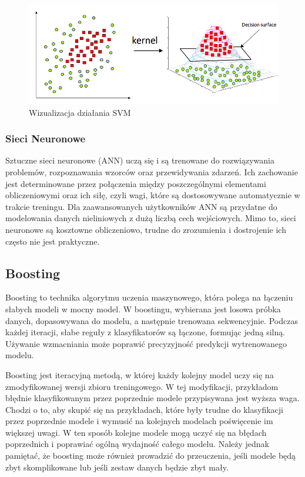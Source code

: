 \documentclass[12pt,a4paper]{article}
\begin{document}
\begin{figure}[h]
    \centering
    \includegraphics[width=0.75\linewidth]{images/svm-visualization.png}
    \caption{Wizualizacja działania SVM \cite{svm-visualization}}
\end{figure}

\subsubsection{Sieci Neuronowe}
Sztuczne sieci neuronowe (ANN) uczą się i są trenowane do rozwiązywania problemów, rozpoznawania wzorców oraz przewidywania zdarzeń. Ich zachowanie jest determinowane przez połączenia między poszczególnymi elementami obliczeniowymi oraz ich siłę, czyli wagi, które są dostosowywane automatycznie w trakcie treningu. Dla zaawansowanych użytkowników ANN są przydatne do modelowania danych nieliniowych z dużą liczbą cech wejściowych. Mimo to, sieci neuronowe są kosztowne obliczeniowo, trudne do zrozumienia i dostrojenie ich często nie jest praktyczne. \cite{classification-models}

\subsection{Boosting}
\label{sec:boosting}
Boosting to technika algorytmu uczenia maszynowego, która polega na łączeniu słabych modeli w mocny model. 
W boostingu, wybierana jest losowa próbka danych, dopasowywana do modelu, a następnie trenowana sekwencyjnie.
Podczas każdej iteracji, słabe reguły z klasyfikatorów są łączone, formując jedną silną. Używanie wzmacniania może poprawić precyzyjność predykcji wytrenowanego modelu.  \cite{boosting-1}


Boosting jest iteracyjną metodą, w której każdy kolejny model uczy się na zmodyfikowanej wersji zbioru treningowego. W tej modyfikacji, przykładom błędnie klasyfikowanym przez poprzednie modele przypisywana jest wyższa waga. Chodzi o to, aby skupić się na przykładach, które były trudne do klasyfikacji przez poprzednie modele i wymusić na kolejnych modelach poświęcenie im większej uwagi. W ten sposób kolejne modele mogą uczyć się na błędach poprzednich i poprawiać ogólną wydajność całego modelu. Należy jednak pamiętać, że boosting może również prowadzić do przeuczenia, jeśli modele będą zbyt skomplikowane lub jeśli zestaw danych będzie zbyt mały. \cite{boosting-2} 
\end{document}
